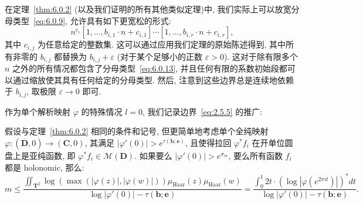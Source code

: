 \begin{remark}\label{rem:6.0.12}
在定理~\ref{thm:6.0.2} (以及我们证明的所有其他类似定理)中, 我们实际上可以放宽分母类型~\eqref{eq:6.0.9}, 允许具有如下更宽松的形式:
\begin{equation}\label{eq:6.0.13}
n^{e_i}[1, \dots, b_{i,1} \cdot n + c_{i,1}] \cdots [1, \dots, b_{i,r} \cdot n + c_{i,r}],
\end{equation}
其中 $c_{i,j}$ 为任意给定的整数集.
这可以通过应用我们定理的原始陈述得到, 其中所有非零的 $b_{i,j}$ 都替换为 $b_{i,j} + \varepsilon$ (对于某个足够小的正数 $\varepsilon > 0$).
这对于除有限多个 $n$ 之外的所有情况都包含了分母类型~\eqref{eq:6.0.13}, 并且任何有限的系数初始段都可以通过缩放使其具有任何给定的分母类型.
然后, 注意到这些边界总是连续地依赖于 $b_{i,j}$, 取极限 $\varepsilon \to 0$ 即可.
\end{remark}

作为单个解析映射 $\varphi$ 的特殊情况 $l=0$, 我们记录边界~\eqref{eq:2.5.5} 的推广:

\begin{corollary}\label{cor:6.0.14}
假设与定理~\ref{thm:6.0.2} 相同的条件和记号, 但更简单地考虑单个全纯映射 $\varphi: (\overline{\mathbf{D}}, 0) \to (\mathbf{C}, 0)$, 其满足 $|\varphi'(0)| > e^{\tau(\mathbf{b}; \mathbf{e})}$, 且使得拉回 $\varphi^* f_i$ 在开单位圆盘上是亚纯函数, 即 $\varphi^* f_i \in \mathcal{M}(\mathbf{D})$.
如果要么 $|\varphi'(0)| > e^{\sigma_m}$, 要么所有函数 $f_i$ 都是 holonomic, 那么:
\begin{equation}\label{eq:6.0.15}
m \le \frac{\iint_{\mathbf{T}^2} \log \left( \max(|\varphi(z)|, |\varphi(w)|) \right) \mu_{\mathrm{Haar}}(z) \mu_{\mathrm{Haar}}(w)}{\log |\varphi'(0)| - \tau(\mathbf{b}; \mathbf{e})} = \frac{\int_0^1 2t \cdot (\log |\varphi(e^{2\pi it})|)^* dt}{\log |\varphi'(0)| - \tau(\mathbf{b}; \mathbf{e})}.
\end{equation}
\end{corollary}

